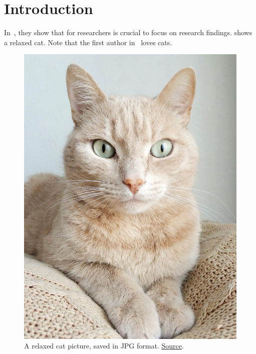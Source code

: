 
\section{Introduction \label{sec:introduction}}
	In~\cite{ACleverResearcher2023}, they show that for researchers is crucial to focus on research findings.
	 shows a relaxed cat. 
	Note that the first author in~\cite{ACleverResearcher2023} loves cats.
	
	\begin{figure}[H]
		\centering
		\includegraphics[height=.5\textwidth]{fig/nice-cat.jpg}
		\caption{
			A relaxed cat picture, saved in JPG format. \href{https://www.pexels.com/photo/orange-tabby-cat-on-brown-knitted-textile-982300/}{Source}.
			\label{fig:cool-images}
		}
	\end{figure}